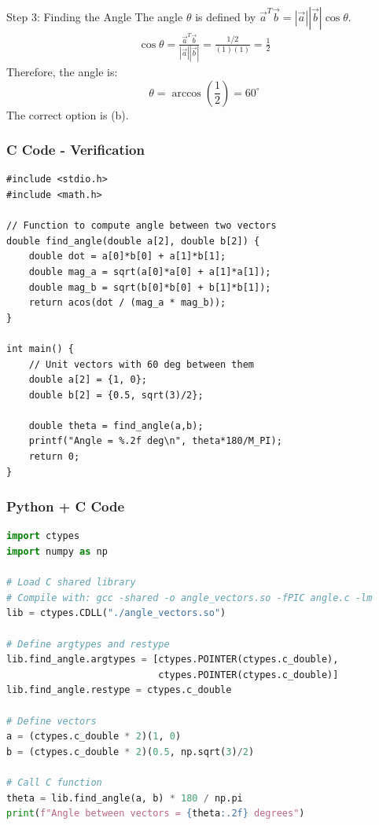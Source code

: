 \documentclass{beamer}
\begin{document}
\begin{frame}{Step 3: Finding the Angle}
The angle $\theta$ is defined by $\vec{a}^T\vec{b} = |\vec{a}||\vec{b}|\cos\theta$.
\begin{align}
    \cos\theta = \frac{\vec{a}^T\vec{b}}{|\vec{a}||\vec{b}|} = \frac{1/2}{(1)(1)} = \frac{1}{2}
\end{align}
Therefore, the angle is:
\[ \theta = \arccos\left(\frac{1}{2}\right) = 60^\circ \]
The correct option is (b).
\end{frame}

\begin{frame}[fragile]
    \frametitle{C Code - Verification}
    \begin{lstlisting}
#include <stdio.h>
#include <math.h>

// Function to compute angle between two vectors
double find_angle(double a[2], double b[2]) {
    double dot = a[0]*b[0] + a[1]*b[1];
    double mag_a = sqrt(a[0]*a[0] + a[1]*a[1]);
    double mag_b = sqrt(b[0]*b[0] + b[1]*b[1]);
    return acos(dot / (mag_a * mag_b));
}

int main() {
    // Unit vectors with 60 deg between them
    double a[2] = {1, 0};
    double b[2] = {0.5, sqrt(3)/2};

    double theta = find_angle(a,b);
    printf("Angle = %.2f deg\n", theta*180/M_PI);
    return 0;
}
    \end{lstlisting}
\end{frame}

\begin{frame}[fragile]
    \frametitle{Python + C Code}
    \begin{lstlisting}[language=Python]
import ctypes
import numpy as np

# Load C shared library
# Compile with: gcc -shared -o angle_vectors.so -fPIC angle.c -lm
lib = ctypes.CDLL("./angle_vectors.so")

# Define argtypes and restype
lib.find_angle.argtypes = [ctypes.POINTER(ctypes.c_double),
                           ctypes.POINTER(ctypes.c_double)]
lib.find_angle.restype = ctypes.c_double

# Define vectors
a = (ctypes.c_double * 2)(1, 0)
b = (ctypes.c_double * 2)(0.5, np.sqrt(3)/2)

# Call C function
theta = lib.find_angle(a, b) * 180 / np.pi
print(f"Angle between vectors = {theta:.2f} degrees")
    \end{lstlisting}
\end{frame}
\end{document}
